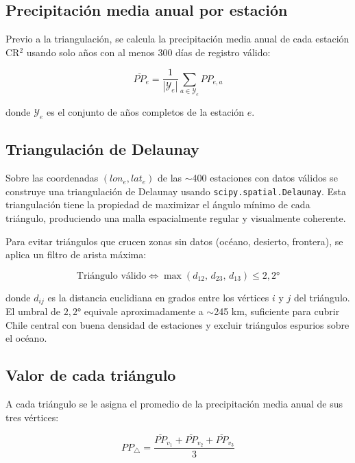 \documentclass[12pt, a4paper]{article}
\begin{document}
\subsection{Precipitación media anual por estación}

Previo a la triangulación, se calcula la precipitación media anual de cada estación CR$^2$ usando solo años con al menos 300 días de registro válido:

\begin{equation}
    \overline{PP}_e = \frac{1}{|\mathcal{Y}_e|}\sum_{a \in \mathcal{Y}_e} PP_{e,a}
\end{equation}

donde $\mathcal{Y}_e$ es el conjunto de años completos de la estación $e$.

\subsection{Triangulación de Delaunay}

Sobre las coordenadas $(lon_e, lat_e)$ de las $\sim$400 estaciones con datos válidos se construye una triangulación de Delaunay usando \texttt{scipy.spatial.Delaunay}. Esta triangulación tiene la propiedad de maximizar el ángulo mínimo de cada triángulo, produciendo una malla espacialmente regular y visualmente coherente.

Para evitar triángulos que crucen zonas sin datos (océano, desierto, frontera), se aplica un filtro de arista máxima:

\begin{equation}
    \text{Triángulo válido} \iff \max\!\left(d_{12},\, d_{23},\, d_{13}\right) \leq 2{,}2°
\end{equation}

donde $d_{ij}$ es la distancia euclidiana en grados entre los vértices $i$ y $j$ del triángulo. El umbral de $2{,}2°$ equivale aproximadamente a $\sim$245 km, suficiente para cubrir Chile central con buena densidad de estaciones y excluir triángulos espurios sobre el océano.

\subsection{Valor de cada triángulo}

A cada triángulo se le asigna el promedio de la precipitación media anual de sus tres vértices:

\begin{equation}
    PP_{\triangle} = \frac{\overline{PP}_{v_1} + \overline{PP}_{v_2} + \overline{PP}_{v_3}}{3}
\end{equation}
\end{document}
